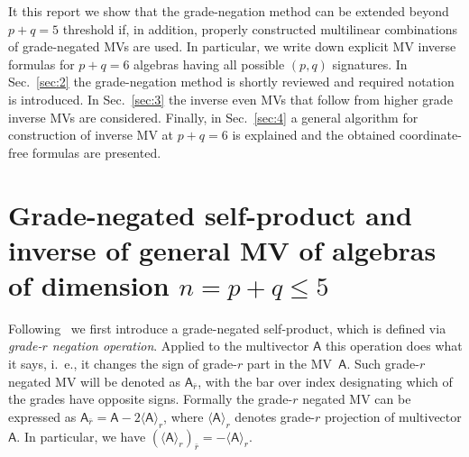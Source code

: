 \documentclass{birkjour}
\def\m#1{\mathsf{#1}} %
\begin{document}
It this report we show that the grade-negation method can be
extended beyond $p+q=5$ threshold if, in addition, properly
constructed  multilinear combinations of grade-negated MVs are
used. In particular,  we write down explicit MV inverse formulas
for $p+q=6$ algebras having all possible   $(p,q)$ signatures. In
Sec.~\ref{sec:2} the grade-negation method is shortly reviewed and
required  notation is introduced. In Sec.~\ref{sec:3}  the inverse
even MVs that follow from higher grade inverse MVs are considered.
Finally, in Sec.~\ref{sec:4} a general algorithm for construction
 of inverse MV at $p+q=6$ is explained and the obtained coordinate-free formulas
are presented.


\section{Grade-negated self-product and inverse of general MV of algebras of dimension $n=p+q\le5$ \label{sec:2}}

Following~\cite{Dadbeh2011} we first introduce a grade-negated
self-product, which  is defined via \textit{grade-$r$ negation
operation}.  Applied to the multivector $\m{A}$ this operation
does what it says, i.~e., it changes the sign of grade-$r$ part in the
MV~$\m{A}$.  Such grade-$r$ negated MV  will be denoted as
$\m{A}_{\bar r}$, with the bar over index designating which of the
grades have opposite signs.  Formally the grade-$r$ negated MV can
be expressed as $\m{A}_{\bar r}=\m{A}-2\langle \m{A}\rangle_r$,
where $\langle \m{A}\rangle_r$ denotes grade-$r$ projection of
multivector  $\m{A}$. In particular, we have
$(\langle\m{A}\rangle_r)_{\bar r}=-\langle\m{A}\rangle_r$.
\end{document}
